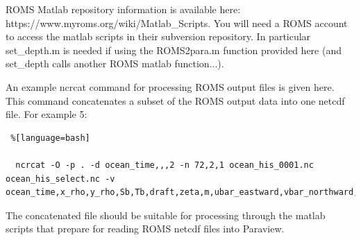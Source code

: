 \documentclass[11pt]{article}
\begin{document}
ROMS Matlab repository information is available here:
https://www.myroms.org/wiki/Matlab\_Scripts.
You will need a ROMS account to access the matlab scripts in their subversion repository.
In particular set\_depth.m is needed if using the ROMS2para.m function provided
here (and set\_depth calls another ROMS matlab function...).

An example ncrcat command for processing ROMS output files is given here.
This command concatenates a subset of the ROMS output data into one netcdf file.
For example 5:
\begin{lstlisting} %[language=bash]

  ncrcat -O -p . -d ocean_time,,,2 -n 72,2,1 ocean_his_0001.nc ocean_his_select.nc -v ocean_time,x_rho,y_rho,Sb,Tb,draft,zeta,m,ubar_eastward,vbar_northward,w,u_eastward,v_northward,temp,salt,h,wetdry_mask_rho,Vtransform,Vstretching,theta_s,theta_b,hc

\end{lstlisting}





The concatenated file should be suitable for processing through the matlab scripts
that prepare for reading ROMS netcdf files into Paraview.
\end{document}
